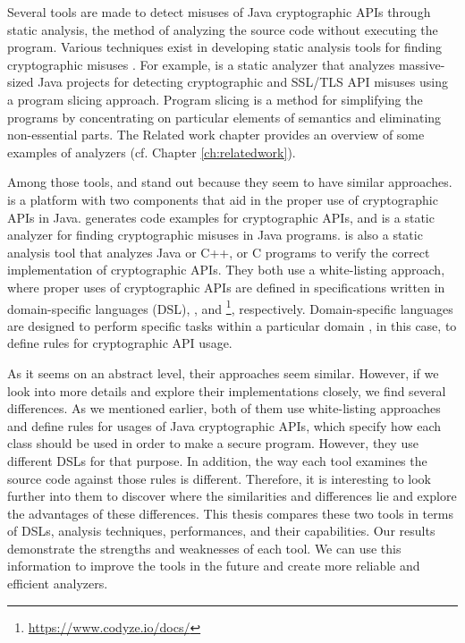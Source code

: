 Several tools are made to detect misuses of Java cryptographic APIs through static analysis, the method of analyzing the source code without executing the program. Various techniques exist in developing static analysis tools for finding cryptographic misuses \cite{emp13, bin18, sr19, skm19, cod}. For example, \cryptoguard{} \cite{sr19} is a static analyzer that analyzes massive-sized Java projects for detecting cryptographic and SSL/TLS API misuses using a program slicing approach. Program slicing is a method for simplifying the programs by concentrating on particular elements of semantics and eliminating non-essential parts. The Related work chapter provides an overview of some examples of analyzers (cf. Chapter \ref{ch:relatedwork}).

Among those tools, \cognicryptsast{} \cite{skm19} and \codyze{} \cite{cod} stand out because they seem to have similar approaches. \cognicrypt{} is a platform with two components that aid in the proper use of cryptographic APIs in Java. \cognicryptgen{} generates code examples for cryptographic APIs, and \cognicryptsast{} is a static analyzer for finding cryptographic misuses in Java programs. \codyze{} is also a static analysis tool that analyzes Java or C++, or C programs to verify the correct implementation of cryptographic APIs. They both use a white-listing approach, where proper uses of cryptographic APIs are defined in specifications written in domain-specific languages (DSL), \crysl{} \cite{skm19}, and \MARK\footnote{\url{https://www.codyze.io/docs/}}, respectively. Domain-specific languages are designed to perform specific tasks within a particular domain \cite{dslwhen}, in this case, to define rules for cryptographic API usage. 

As it seems on an abstract level, their approaches seem similar. However, if we look into more details and explore their implementations closely, we find several differences. As we mentioned earlier, both of them use white-listing approaches and define rules for usages of Java cryptographic APIs, which specify how each class should be used in order to make a secure program. However, they use different DSLs for that purpose. In addition, the way each tool examines the source code against those rules is different. Therefore, it is interesting to look further into them to discover where the similarities and differences lie and explore the advantages of these differences. This thesis compares these two tools in terms of DSLs, analysis techniques, performances, and their capabilities. Our results demonstrate the strengths and weaknesses of each tool. We can use this information to improve the tools in the future and create more reliable and efficient analyzers.

